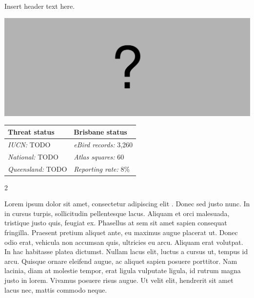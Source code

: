 \documentclass[12pt,openany,oneside]{book}
\let\origfigure\figure
\let\endorigfigure\endfigure
\renewenvironment{figure}[1][2] {
  \expandafter\origfigure\expandafter[H]
} {
  \endorigfigure
}
\let\Begin\begin
\let\End\end
\theoremstyle{definition}
\theoremstyle{definition}
\theoremstyle{definition}
\theoremstyle{remark}
\begin{document}

Insert header text here.

\begin{figure}
\centering
\includegraphics[width=\textwidth,keepaspectratio=true]{assets/misc/missing-profile.png}
\caption{Insert caption here.}
\end{figure}

\begin{tabu} to 
\toprule
Threat status & Brisbane status\\
\midrule
\textit{IUCN:} TODO & \textit{eBird records:} 3,260\\
\textit{National:} TODO & \textit{Atlas squares:} 60\\
\textit{Queensland:} TODO & \textit{Reporting rate:} 8\%\\
\bottomrule
\end{tabu} 
\vspace{0.15cm}

\Begin{multicols}{2}

Lorem ipsum dolor sit amet, consectetur adipiscing elit
\citep{rexample1, rexample2, rexample3}. Donec sed justo nunc. In in
cursus turpis, sollicitudin pellentesque lacus. Aliquam et orci
malesuada, tristique justo quis, feugiat ex. Phasellus at sem sit amet
sapien consequat fringilla. Praesent pretium aliquet ante, eu maximus
augue placerat ut. Donec odio erat, vehicula non accumsan quis,
ultricies eu arcu. Aliquam erat volutpat. In hac habitasse platea
dictumst. Nullam lacus elit, luctus a cursus ut, tempus id arcu. Quisque
ornare eleifend augue, ac aliquet sapien posuere porttitor. Nam lacinia,
diam at molestie tempor, erat ligula vulputate ligula, id rutrum magna
justo in lorem. Vivamus posuere risus augue. Ut velit elit, hendrerit
sit amet lacus nec, mattis commodo neque.

\End{multicols}

\clearpage
\end{document}
